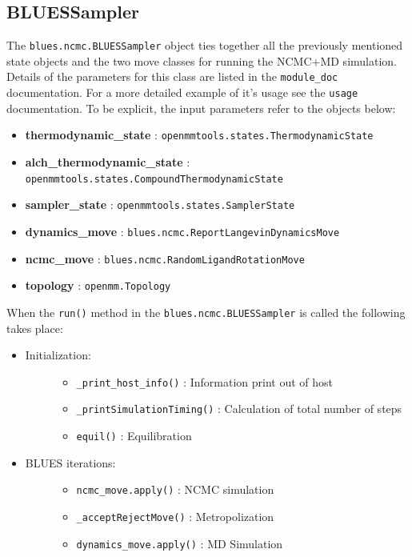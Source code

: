 \hypertarget{bluessampler}{%
\subsection{BLUESSampler}\label{bluessampler}}

The \texttt{blues.ncmc.BLUESSampler} object ties together all the previously mentioned state objects and the two move classes for running the NCMC+MD simulation.
Details of the parameters for this class are listed in the \texttt{module_doc} documentation.
For a more detailed example of it's usage see the \texttt{usage} documentation.
To be explicit, the input parameters refer to the objects below:

\begin{itemize}
\tightlist
\item
  \textbf{thermodynamic\_state} :
  \texttt{openmmtools.states.ThermodynamicState}
\item
  \textbf{alch\_thermodynamic\_state} :
  \texttt{openmmtools.states.CompoundThermodynamicState}
\item
  \textbf{sampler\_state} : \texttt{openmmtools.states.SamplerState}
\item
  \textbf{dynamics\_move} :
  \texttt{blues.ncmc.ReportLangevinDynamicsMove}
\item
  \textbf{ncmc\_move} : \texttt{blues.ncmc.RandomLigandRotationMove}
\item
  \textbf{topology} : \texttt{openmm.Topology}
\end{itemize}

When the \texttt{run()} method in the \texttt{blues.ncmc.BLUESSampler} is called the following takes place:
\begin{itemize}
\item
  \begin{description}
  \item[Initialization:] 
  \begin{itemize}
  \tightlist
  \item
    \texttt{_print_host_info()} : Information print out of host
  \item
    \texttt{_printSimulationTiming()} : Calculation of total number of steps
  \item
    \texttt{equil()} : Equilibration
  \end{itemize}
  \end{description}
\item
  \begin{description}
  \item[BLUES iterations:]
  \begin{itemize}
  \tightlist
  \item
    \texttt{ncmc_move.apply()} : NCMC simulation
  \item
    \texttt{_acceptRejectMove()} : Metropolization
  \item
    \texttt{dynamics_move.apply()} : MD Simulation
  \end{itemize}
  \end{description}
\end{itemize}

